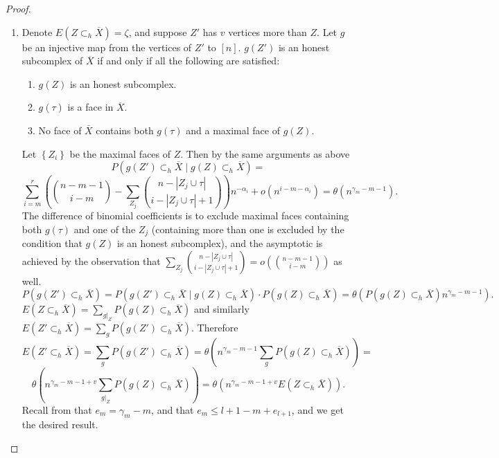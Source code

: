 \documentclass[10pt,a4paper]{amsart}
\newcommand{\crb}[1]{\left\{ #1 \right\}}
\newcommand{\prs}[1]{\left( #1 \right)}
\begin{document}
\begin{proof}
\begin{enumerate}
 But $\gamma_d\le \beta < l+1$, giving the budget.
 \item Denote $E(Z\subset_h\overline{X})=\zeta$, and suppose $Z'$ has $v$ vertices more than $Z$. Let $g$ be an injective map from the vertices of $Z'$ to $[n]$. $g(Z')$ is an honest subcomplex of $\overline{X}$ if and only if all the following are satisfied:
 \begin{enumerate}[label=\alph*)]
     \item $g(Z)$ is an honest subcomplex.
     \item $g(\tau)$ is a face in $\overline{X}$.
     \item No face of $\overline{X}$ contains both $g(\tau)$ and a maximal face of $g(Z)$.
 \end{enumerate}
 Let $\crb{Z_i}$ be the maximal faces of $Z$. Then by the same arguments as above
 $$P\prs{g(Z')\subset_h\overline{X}\mid g(Z)\subset_h\overline{X}}=$$$$\sum_{i=m} ^r \prs{\binom{n-m-1}{i-m}-\sum_{Z_j}\binom{n-|Z_j\cup \tau|}{i-|Z_j\cup \tau|+1}}n^{-\alpha_i}+o(n^{i-m-\alpha_i})=\theta(n^{\gamma_m-m-1}).$$
The difference of binomial coefficients is to exclude maximal faces containing both $g(\tau)$ and one of the $Z_j$ (containing more than one is excluded by the condition that $g(Z)$ is an honest subcomplex), and the asymptotic is achieved by the observation that $\sum_{Z_j}\binom{n-|Z_j\cup \tau|}{i-|Z_j\cup \tau|+1}=o\prs{\binom{n-m-1}{i-m}}$ as well.
$$P(g(Z')\subset_h\overline{X})=P(g(Z')\subset_h\overline{X}\mid g(Z)\subset_h\overline{X})\cdot P(g(Z)\subset_h\overline{X})=\theta\prs{P(g(Z)\subset_h\overline{X})n^{\gamma_m-m-1}}.$$
$E(Z\subset_h\overline{X})=\sum_{g|_Z}P(g(Z)\subset_h\overline{X})$ and similarly $E(Z'\subset_h\overline{X})=\sum_{g}P(g(Z')\subset_h\overline{X})$.
Therefore 
$$E(Z'\subset_h\overline{X})=\sum_{g}P(g(Z')\subset_h\overline{X})=\theta\prs{n^{\gamma_m-m-1}\sum_{g}P(g(Z)\subset_h\overline{X})}=$$
$$\theta\prs{n^{\gamma_m-m-1+v}\sum_{g|_Z}P(g(Z)\subset_h\overline{X})}=\theta\prs{n^{\gamma_m-m-1+v}E(Z\subset_h\overline{X})}.$$
Recall from  that $e_m=\gamma_m-m$, and that $e_m\le l+1-m+e_{l+1}$, and we get the desired result.
    \end{enumerate}
\end{proof}
\end{document}

